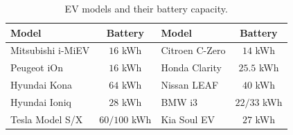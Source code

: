 \documentclass[journal]{IEEEtran}
\newcommand{\revv}[1]{{\color{black}#1}}%
\begin{document}
						
\begin{table}[!t]
				\centering
				\caption{\revv{EV models and their battery capacity.}}
				\label{tb:models}\revv{
				\begin{tabular}{ | l| c | l| c |}
					\hline
					\textbf{Model} & \textbf{Battery} & \textbf{Model} & \textbf{Battery} \\ \hline\hline    
				Mitsubishi i-MiEV & $16$ kWh & Citroen C-Zero & $14$ kWh \\ \hline
				Peugeot iOn  & $16$ kWh & Honda Clarity & $25.5$ kWh\\\hline
				Hyundai Kona & $64$ kWh & Nissan LEAF & $40$ kWh \\ \hline
				Hyundai Ioniq & $28$ kWh & BMW i3 & $22/33$ kWh \\ \hline
				Tesla Model S/X  & $60/100$ kWh & Kia Soul EV  & $27$ kWh\\\hline
				\end{tabular}}
			\end{table}
			
\end{document}
